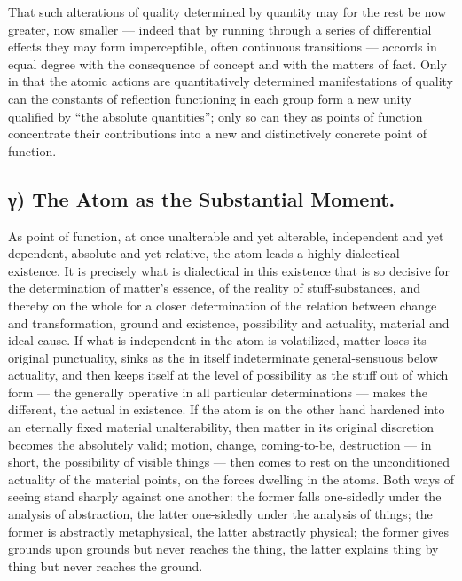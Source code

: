 \documentclass[12pt,a4paper]{book}
\begin{document}
That such alterations of quality determined by quantity may for the rest be now
greater, now smaller --- indeed that by running through a series of
differential effects they may form imperceptible, often continuous transitions
--- accords in equal degree with the consequence of concept and with the
matters of fact. Only in that the atomic actions are quantitatively
determined manifestations of quality can the constants of reflection
functioning in each group form a new unity qualified by ``the absolute
quantities''; only so can they as points of function concentrate their
contributions into a new and distinctively concrete point of function.

\subsection*{γ) The Atom as the Substantial Moment.}


As point of function, at once unalterable and yet alterable, independent and
yet dependent, absolute and yet relative, the atom leads a highly dialectical
existence. It is precisely what is dialectical in this existence that is so
decisive for the determination of matter's essence, of the reality of
stuff-substances, and thereby on the whole for a closer determination of the
relation between change and transformation, ground and existence, possibility
and actuality, material and ideal cause. If what is independent in the atom is
volatilized, matter loses its original punctuality, sinks as the in itself
indeterminate general-sensuous below actuality, and then keeps itself at the
level of possibility as the stuff out of which form --- the generally operative
in all particular determinations --- makes the different, the actual in
existence. If the atom is on the other hand hardened into an eternally fixed
material unalterability, then matter in its original discretion becomes
the absolutely valid; motion, change, coming-to-be, destruction --- in short,
the possibility of visible things --- then comes to rest on the unconditioned
actuality of the material points, on the forces dwelling in the atoms. Both
ways of seeing stand sharply against one another: the former falls one-sidedly
under the analysis of abstraction, the latter one-sidedly under the analysis of
things; the former is abstractly metaphysical, the latter abstractly physical;
the former gives grounds upon grounds but never reaches the thing, the latter
explains thing by thing but never reaches the ground.
\end{document}
